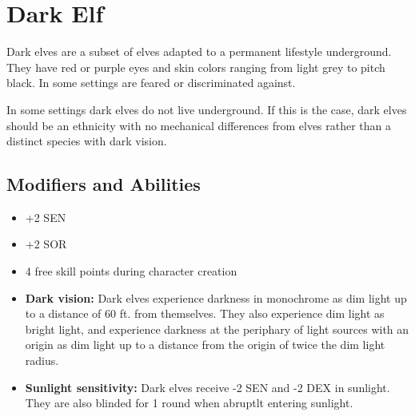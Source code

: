 \section{Dark Elf}\label{dark-elf}
Dark elves are a subset of elves adapted to a permanent lifestyle underground.
They have red or purple eyes and skin colors ranging from light grey to pitch
black. In some settings are feared or discriminated against.

In some settings dark elves do not live underground. If this is the case, dark
elves should be an ethnicity with no mechanical differences from elves rather
than a distinct species with dark vision.

\subsection{Modifiers and Abilities}
\begin{itemize}
    \item +2 SEN
    \item +2 SOR
    \item 4 free skill points during character creation
    \item \textbf{Dark vision:} Dark elves experience darkness in monochrome as
        dim light up to a distance of 60 ft. from themselves. They also
        experience dim light as bright light, and experience darkness at the
        periphary of light sources with an origin as dim light up to a distance
        from the origin of twice the dim light radius.
    \item \textbf{Sunlight sensitivity:} Dark elves receive -2 SEN and -2 DEX
        in sunlight. They are also blinded for 1 round when abruptlt entering
        sunlight.
\end{itemize}
